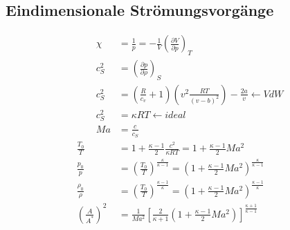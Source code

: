 \documentclass[twocolumn]{article}
\begin{document}
\pagebreak
\begin{multicols}{2}

%                                                                             

\section{Eindimensionale Strömungsvorgänge}

\begin{align*}
	\qquad  \chi &= \frac{1}{p} = - \frac{1}{V}\left(\frac{\partial V}{\partial p}\right)_{T}  \\
	\qquad c_S^2 &= \left(\frac{\partial p}{\partial \rho}\right)_{S} \\
	\qquad c_S^2 &= \left(\frac{R}{c_v}+ 1\right)\left(v^2 \frac{RT}{(v-b)^2}\right) - \frac{2a}{v}\leftarrow VdW \\
	\qquad c_S^2 &= \kappa RT \leftarrow ideal\\
	\qquad Ma &= \frac{c}{c_S} \\
		\frac{T_0}{T} &= 1 + \frac{\kappa -1}{2} \frac{c^2}{\kappa RT} = 1 + \frac{\kappa -1}{2}Ma^2 \\
		\frac{p_0}{p} &= \left(\frac{T_0}{T}\right)^{\frac{\kappa}{\kappa-1}} = \left(1 + \frac{\kappa -1}{2}Ma^2\right)^{\frac{\kappa}{\kappa-1}} \\
		\frac{\rho_0}{\rho} &= \left(\frac{T_0}{T}\right)^{\frac{\kappa-1}{\kappa}} = \left(1 + \frac{\kappa -1}{2}Ma^2\right)^{\frac{\kappa -1 }{\kappa}} \\
		\left(\frac{A}{A^{*}}\right)^2 &= \frac{1}{Ma^2}\left[\frac{2}{\kappa + 1}\left( 1 + \frac{\kappa -1}{2} Ma^2 \right)\right]^{\frac{\kappa +1}{\kappa -1}} \\
\end{align*}


\end{multicols}
\end{document}
